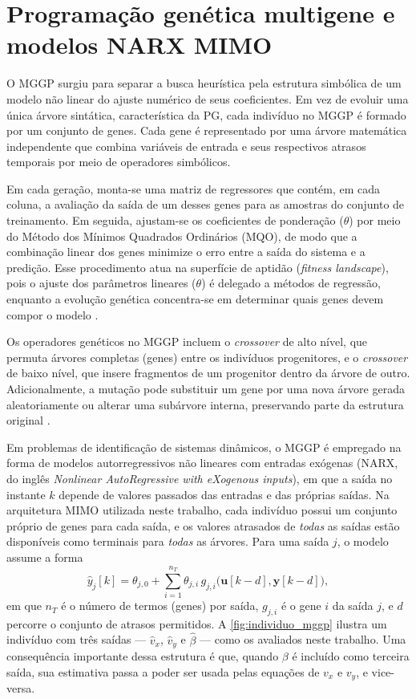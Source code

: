 \section{Programação genética multigene e modelos NARX MIMO}\label{sec:mggp}

O MGGP surgiu para separar a busca heurística pela estrutura simbólica de um modelo não linear do ajuste numérico de seus coeficientes. Em vez de evoluir uma única árvore sintática, característica da PG, cada indivíduo no MGGP é formado por um conjunto de genes. Cada gene é representado por uma árvore matemática independente que combina variáveis de entrada e seus respectivos atrasos temporais por meio de operadores simbólicos.

Em cada geração, monta-se uma matriz de regressores que contém, em cada coluna, a avaliação da saída de um desses genes para as amostras do conjunto de treinamento. Em seguida, ajustam-se os coeficientes de ponderação ($\theta$) por meio do Método dos Mínimos Quadrados Ordinários (MQO), de modo que a combinação linear dos genes minimize o erro entre a saída do sistema e a predição. Esse procedimento atua na superfície de aptidão (\textit{fitness landscape}), pois o ajuste dos parâmetros lineares ($\theta$) é delegado a métodos de regressão, enquanto a evolução genética concentra-se em determinar quais genes devem compor o modelo \cite{pandey2015a, pereda2020}.

Os operadores genéticos no MGGP incluem o \textit{crossover} de alto nível, que permuta árvores completas (genes) entre os indivíduos progenitores, e o \textit{crossover} de baixo nível, que insere fragmentos de um progenitor dentro da árvore de outro. Adicionalmente, a mutação pode substituir um gene por uma nova árvore gerada aleatoriamente ou alterar uma subárvore interna, preservando parte da estrutura original \cite{koza2009, willis1997}.

Em problemas de identificação de sistemas dinâmicos, o MGGP é empregado na forma de modelos autorregressivos não lineares com entradas exógenas (NARX, do inglês \textit{Nonlinear AutoRegressive with eXogenous inputs}), em que a saída no instante $k$ depende de valores passados das entradas e das próprias saídas. Na arquitetura MIMO utilizada neste trabalho, cada indivíduo possui um conjunto próprio de genes para cada saída, e os valores atrasados de \emph{todas} as saídas estão disponíveis como terminais para \emph{todas} as árvores. Para uma saída $j$, o modelo assume a forma
\begin{equation}
    \hat y_j[k] = \theta_{j,0} + \sum_{i=1}^{n_T} \theta_{j,i}\, g_{j,i}\big(\mathbf{u}[k-d], \hat{\mathbf{y}}[k-d]\big),
    \label{eq:mggp_mimo}
\end{equation}
em que $n_T$ é o número de termos (genes) por saída, $g_{j,i}$ é o gene $i$ da saída $j$, e $d$ percorre o conjunto de atrasos permitidos. A \autoref{fig:individuo_mggp} ilustra um indivíduo com três saídas --- $\hat v_x$, $\hat v_y$ e $\hat\beta$ --- como os avaliados neste trabalho. Uma consequência importante dessa estrutura é que, quando $\beta$ é incluído como terceira saída, sua estimativa passa a poder ser usada pelas equações de $v_x$ e $v_y$, e vice-versa.

